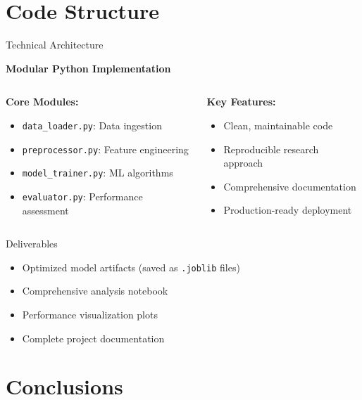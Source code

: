 \documentclass[aspectratio=169]{beamer}
\begin{document}
\section{Code Structure}

\begin{frame}{Technical Architecture}
\begin{center}
\textbf{Modular Python Implementation}
\end{center}

\vspace{0.3cm}
\begin{columns}
\begin{column}{0.5\textwidth}
\textbf{Core Modules:}
\begin{itemize}
\item \texttt{data\_loader.py}: Data ingestion
\item \texttt{preprocessor.py}: Feature engineering
\item \texttt{model\_trainer.py}: ML algorithms
\item \texttt{evaluator.py}: Performance assessment
\end{itemize}
\end{column}
\begin{column}{0.5\textwidth}
\textbf{Key Features:}
\begin{itemize}
\item Clean, maintainable code
\item Reproducible research approach
\item Comprehensive documentation
\item Production-ready deployment
\end{itemize}
\end{column}
\end{columns}

\vspace{0.5cm}
\begin{block}{Deliverables}
\begin{itemize}
\item Optimized model artifacts (saved as \texttt{.joblib} files)
\item Comprehensive analysis notebook
\item Performance visualization plots
\item Complete project documentation
\end{itemize}
\end{block}
\end{frame}

\section{Conclusions}
\end{document}
